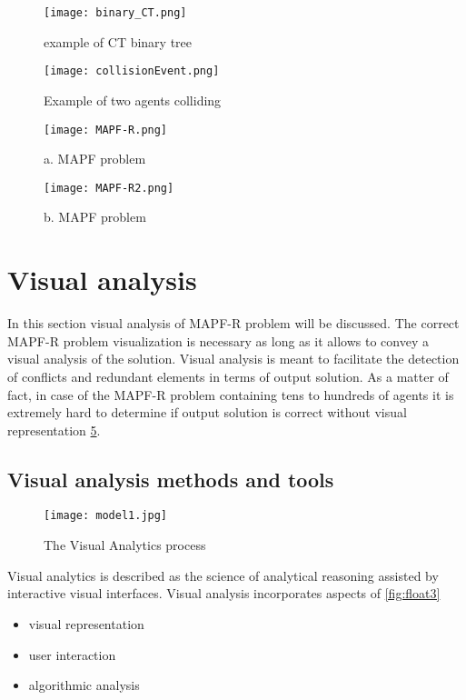 \documentclass[thesis=B,english]{FITthesis}[2019/12/23]
\begin{document}
\begin{figure}\centering
	\texttt{[image: binary\_CT.png]}
	\caption[example of CT binary tree]{example of CT binary tree}\label{fig:float1}
\end{figure}

\begin{figure}
	\texttt{[image: collisionEvent.png]}
	\caption[Example of two agents colliding]{Example of two agents colliding}\label{fig:float103}
\end{figure}


\begin{figure}\centering
	\texttt{[image: MAPF-R.png]}
	\caption[a. MAPF problem]{a. MAPF problem}\label{fig:float107}
\end{figure}



\begin{figure}\centering
	\texttt{[image: MAPF-R2.png]}
	\caption[b. MAPF problem]{b. MAPF problem}\label{fig:float108}
\end{figure}

\section{Visual analysis}

In this section visual analysis of MAPF-R problem will be discussed. The correct MAPF-R problem visualization is necessary as long as it allows to convey a visual analysis of the solution. Visual analysis is meant to facilitate the detection of conflicts and redundant elements in terms of output solution. As a matter of fact, in case of the MAPF-R problem containing tens to hundreds of agents it is extremely hard to determine if output solution is correct without visual representation \ref{fig:float2}.

\subsection{Visual analysis methods and tools}

\begin{figure}\centering
	\texttt{[image: model1.jpg]}
	\caption[The Visual Analytics process]{The Visual Analytics process}\label{fig:float2}
\end{figure}

Visual analytics is described as the science of analytical reasoning assisted by interactive visual interfaces. Visual analysis incorporates aspects of \ref{fig:float3}
\begin{itemize}
\item visual representation
\item user interaction
\item algorithmic analysis
\end{itemize}
\end{document}
